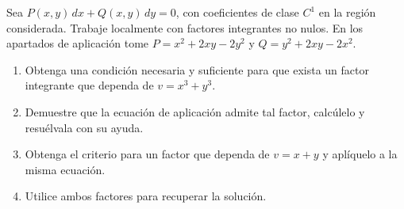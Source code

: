 Sea $P(x,y)\,dx+Q(x,y)\,dy=0$, con coeficientes de clase $C^1$ en la región considerada. Trabaje localmente con factores integrantes no nulos. En los apartados de aplicación tome $P=x^2+2xy-2y^2$ y $Q=y^2+2xy-2x^2$.

\begin{enumerate}[label=(\alph*),ref=\alph*,leftmargin=*]
\item Obtenga una condición necesaria y suficiente para que exista un factor integrante que dependa de $v=x^3+y^3$.
\item Demuestre que la ecuación de aplicación admite tal factor, calcúlelo y resuélvala con su ayuda.
\item Obtenga el criterio para un factor que dependa de $v=x+y$ y aplíquelo a la misma ecuación.
\item Utilice ambos factores para recuperar la solución.
\end{enumerate}
